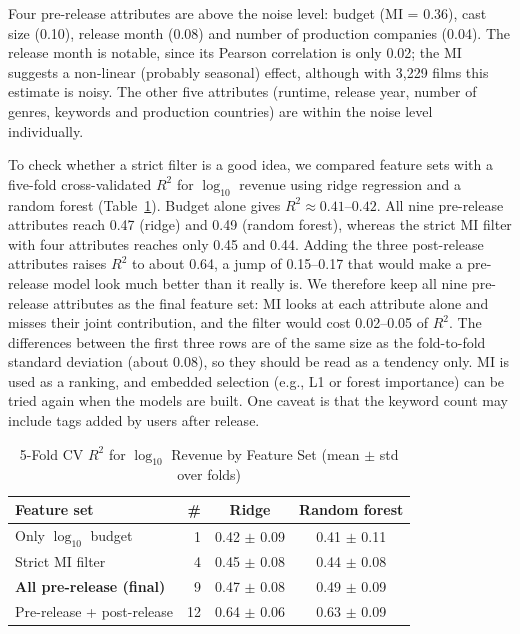 \documentclass[conference]{IEEEtran}
\begin{document}
Four pre-release attributes are above the noise level: budget (MI = 0.36), cast size (0.10), release
month (0.08) and number of production companies (0.04). The release month is notable, since its
Pearson correlation is only 0.02; the MI suggests a non-linear (probably seasonal) effect, although
with 3,229 films this estimate is noisy. The other five attributes (runtime, release year, number of
genres, keywords and production countries) are within the noise level individually.

To check whether a strict filter is a good idea, we compared feature sets with a five-fold
cross-validated $R^2$ for $\log_{10}$ revenue using ridge regression and a random forest
(Table~\ref{tab:p4_sel}). Budget alone gives $R^2\approx0.41$--$0.42$. All nine pre-release attributes
reach 0.47 (ridge) and 0.49 (random forest), whereas the strict MI filter with four attributes reaches only 0.45
and 0.44. Adding the three post-release attributes raises $R^2$ to about 0.64, a jump of 0.15--0.17 that
would make a pre-release model look much better than it really is. We therefore keep all nine pre-release attributes
as the final feature set: MI looks at each attribute alone and misses their joint contribution, and the
filter would cost 0.02--0.05 of $R^2$. The differences between the first three rows
are of the same size as the fold-to-fold standard deviation (about 0.08), so they should be read as a tendency
only. MI is used as a ranking, and embedded selection (e.g., L1 or forest importance) can be tried again
when the models are built. One caveat is that the keyword count may include tags added by users after release.

\begin{table}[t]
\caption{5-Fold CV $R^2$ for $\log_{10}$ Revenue by Feature Set (mean $\pm$ std over folds)}
\label{tab:p4_sel}
\centering
\scriptsize
\setlength{\tabcolsep}{3.5pt}
\begin{tabular}{lrcc}
\toprule
Feature set & \# & Ridge & Random forest \\
\midrule
Only $\log_{10}$ budget & 1 & 0.42 $\pm$ 0.09 & 0.41 $\pm$ 0.11 \\
Strict MI filter & 4 & 0.45 $\pm$ 0.08 & 0.44 $\pm$ 0.08 \\
\textbf{All pre-release (final)} & 9 & 0.47 $\pm$ 0.08 & 0.49 $\pm$ 0.09 \\
Pre-release + post-release & 12 & 0.64 $\pm$ 0.06 & 0.63 $\pm$ 0.09 \\
\bottomrule
\end{tabular}
\end{table}
\end{document}
